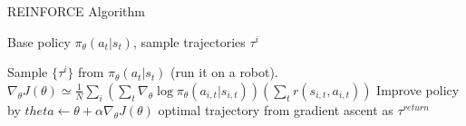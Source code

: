 \begin{algorithm}[t!]
\caption{REINFORCE Algorithm}
\begin{algorithmic}[1]
\label{alg:reinforce}
\REQUIRE Base policy $\pi_\theta(a_t|s_t)$, sample trajectories $\tau^i$

    \STATE Sample $\{\tau^i\}$ from $\pi_\theta(a_t|s_t)$ (run it on a robot).
    \STATE $\nabla_\theta J(\theta) \simeq \frac{1}{N}\sum_i\left(\sum_t\nabla_\theta \log\pi_\theta(a_{i,t}|s_{i,t})\right)\left(\sum_t r(s_{i,t},a_{i,t})\right)$
    \STATE Improve policy by $theta \leftarrow \theta + \alpha\nabla_\theta J(\theta)$
\ENDWHILE
\RETURN optimal trajectory from gradient ascent as $\tau^{return}$
\end{algorithmic}
\end{algorithm}